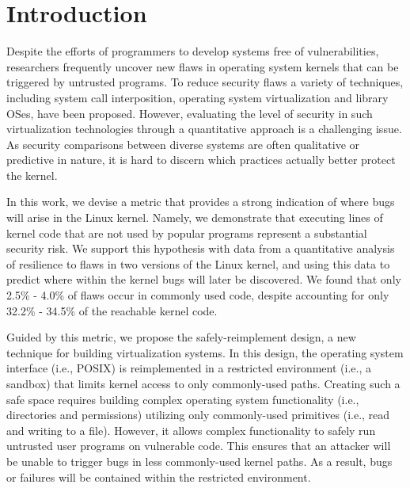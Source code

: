 \section{Introduction}
\label{sec.introduction}

Despite the efforts of programmers to develop systems free of vulnerabilities,
researchers frequently uncover new flaws in operating system kernels that can be
triggered by untrusted programs. To reduce security flaws
a variety of techniques, including system call interposition, operating system
virtualization and library OSes,
have been proposed. However, evaluating the level of security
in such virtualization technologies through a quantitative approach is a challenging issue.
As security comparisons between diverse systems are often qualitative
or predictive in nature, it is hard
to discern which practices actually better protect the kernel.


In this work, we devise a metric that provides a strong indication of where bugs
will arise in the Linux kernel. Namely, we demonstrate
that executing lines of kernel code that are not used by popular programs represent
a substantial security risk. We support this hypothesis with data from a quantitative
analysis of resilience to flaws in two versions of the Linux kernel, and using this data
to predict where within the kernel bugs will later be discovered. We found that only 2.5\% - 4.0\%
of flaws occur in commonly used code, despite accounting for only
32.2\% - 34.5\% of the reachable kernel code.

Guided by this metric, we propose the safely-reimplement design, a new
technique for building virtualization systems. In this design, the operating
system interface (i.e., POSIX) is reimplemented in a restricted environment
(i.e., a sandbox) that limits kernel access to only commonly-used paths.
Creating such a safe space requires building complex operating system functionality
(i.e., directories and permissions) utilizing only commonly-used primitives (i.e.,
read and writing to a file). However, it allows complex functionality to safely
run untrusted user programs on vulnerable code.
This ensures that an attacker will be unable to trigger bugs in less
commonly-used kernel paths. As a result, bugs or failures
will be contained within the restricted environment.

